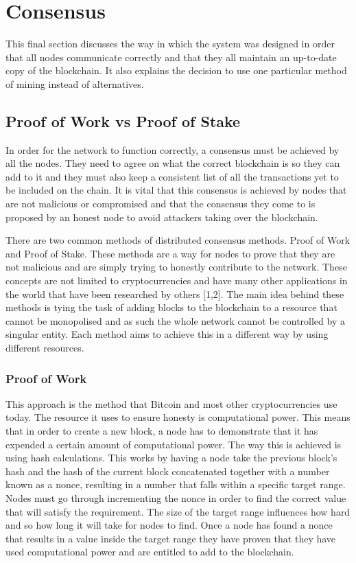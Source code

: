 \documentclass{l4proj}
\begin{document}
\section{Consensus}
This final section discusses the way in which the system was designed in order that all nodes communicate correctly and
that they all maintain an up-to-date copy of the blockchain. It also explains the decision to 
use one particular method of mining instead of alternatives.

\subsection{Proof of Work vs Proof of Stake}
In order for the network to function correctly, a consensus must be achieved by all the nodes. They need to agree
on what the correct blockchain is so they can add to it and they must also keep a consistent list of all the 
transactions yet to be included on the chain. It is vital that this consensus is achieved by nodes that are not
malicious or compromised and that the consensus they come to is proposed by an honest node to avoid attackers
taking over the blockchain. 

There are two common methods of distributed consensus methods. Proof of Work and Proof of Stake. These methods
are a way for nodes to prove that they are not malicious and are simply trying to honestly contribute to the
network. These concepts are not limited to cryptocurrencies and have many other applications in the world that 
have been researched by others [1,2]. The main idea behind these methods is tying the task of adding blocks to the 
blockchain to a resource that cannot be monopolised and as such the whole network cannot be controlled by a 
singular entity. Each method aims to achieve this in a different way by using different resources.

\subsubsection{Proof of Work}
This approach is the method that Bitcoin and most other cryptocurrencies use today. The resource it uses to 
ensure honesty is computational power. This means that in order to create a new block, a node has to demonstrate
that it has expended a certain amount of computational power. The way this is achieved is using hash calculations. 
This works by having a node take the previous block's
hash and the hash of the current block concatenated together with a number known as a nonce, resulting in a number
that falls within a specific target range. Nodes must go through incrementing the nonce in order to find the 
correct value that will satisfy the requirement. The size of the target range influences how hard and so how long
it will take for nodes to find. Once a node has found a nonce that results in a value inside the target range
they have proven that they have used computational power and are entitled to add to the blockchain.
\end{document}

